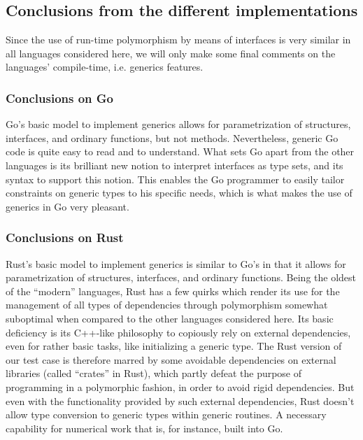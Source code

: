 \documentclass[11pt,oneside]{article}
\begin{document}


\subsection{Conclusions from the different implementations}

Since the use of run-time polymorphism by means of interfaces is very
similar in all languages considered here, we will only make some final
comments on the languages' compile-time, i.e.  generics features.

\subsubsection{Conclusions on Go}

Go's basic model to implement generics allows for parametrization of
structures, interfaces, and ordinary functions, but not methods.
Nevertheless, generic Go code is quite easy to read and to understand.
What sets Go apart from the other languages is its brilliant new
notion to interpret interfaces as type sets, and its syntax to support
this notion. This enables the Go programmer to easily tailor
constraints on generic types to his specific needs, which is what
makes the use of generics in Go very pleasant.

\subsubsection{Conclusions on Rust}

Rust's basic model to implement generics is similar to Go's in that it
allows for parametrization of structures, interfaces, and ordinary
functions. Being the oldest of the ``modern'' languages, Rust has a
few quirks which render its use for the management of all types of
dependencies through polymorphism somewhat suboptimal when compared to
the other languages considered here. Its basic deficiency is its
C++-like philosophy to copiously rely on external dependencies, even
for rather basic tasks, like initializing a generic type. The Rust
version of our test case is therefore marred by some avoidable
dependencies on external libraries (called ``crates'' in Rust), which
partly defeat the purpose of programming in a polymorphic fashion, in
order to avoid rigid dependencies. But even with the functionality
provided by such external dependencies, Rust doesn't allow type
conversion to generic types within generic routines. A necessary
capability for numerical work that is, for instance, built into Go.
\end{document}

